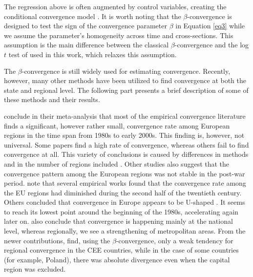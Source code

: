 \documentclass[11pt]{article}
\begin{document}
The regression above is often augmented by control variables, creating the conditional convergence model \citep{sala1996regional}. It is worth noting that the $\beta$-convergence is designed to test the sign of the convergence parameter $\beta$ in Equation \ref{eq3} while we assume the parameter's homogeneity across time and cross-sections. This assumption is the main difference between the classical  $\beta$-convergence and the log $t$ test of \citet{phillips2007transition} used in this work, which relaxes this assumption.

The $\beta$-convergence is still widely used for estimating convergence. Recently, however, many other methods have been utilized to find convergence at both the state and regional level. The following part presents a brief description of some of these methods and their results.
  

\citet{eckey2007convergence} conclude in their meta-analysis that most of the empirical convergence literature finds a significant, however rather small, convergence rate among European regions in the time span from 1980s to early 2000s. This finding is, however, not universal. Some papers find a high rate of convergence, whereas others fail to find convergence at all. This variety of conclusions is caused by differences in methods and in the number of regions included \citep{eckey2007convergence}. Other studies also suggest that the convergence pattern among the European regions was not stable in the post-war period. \citet{eckey2007convergence} note that several empirical works found that the convergence rate among the EU regions had diminished during the second half of the twentieth century. Others concluded that convergence in Europe appears to be U-shaped \citep{basile2001regional, geppert2008regional}. It seems to reach its lowest point around the beginning of the 1980s, accelerating again later on. \citet{geppert2008regional} also conclude that convergence is happening mainly at the national level, whereas regionally, we see a strengthening of metropolitan areas. From the newer contributions, \citet*{sme2012regional} find, using the $\beta$-convergence, only a weak tendency for regional convergence in the CEE countries, while in the case of some countries (for example, Poland), there was absolute divergence even when the capital region was excluded. %
 
\end{document}
